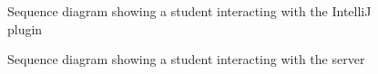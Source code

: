 \begin{figure}[H]
  \centering
  \caption[Student-plugin sequence diagram]{Sequence diagram showing a student interacting with the IntelliJ plugin}
  \label{fig:sequence-diagram-student-plugin}
\end{figure}

\begin{figure}[H]
  \centering
  \caption[Student-server sequence diagram]{Sequence diagram showing a student interacting with the server}
  \label{fig:sequence-diagram-student-server}
\end{figure}

